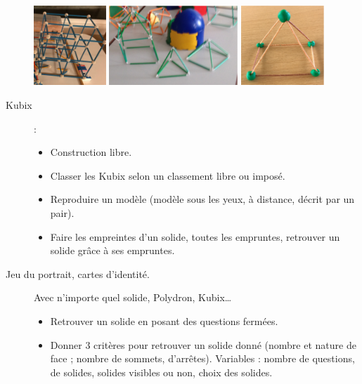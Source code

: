 \begin{exercice*}
\begin{description}
\begin{itemize}
      \end{itemize}
      \begin{center}
         \includegraphics[height=3cm]{Geometrie_did/Images/Geo6_activites_tiges1} \qquad \includegraphics[height=3cm]{Geometrie_did/Images/Geo6_activites_tiges2} \qquad \includegraphics[height=3cm]{Geometrie_did/Images/Geo6_activites_tiges3}
      \end{center}
   \item[Kubix]:
      \begin{itemize}
         \item Construction libre.
         \item Classer les Kubix selon un classement libre ou imposé.
         \item Reproduire un modèle (modèle sous les yeux, à distance, décrit par un pair).
         \item Faire les empreintes d'un solide, toutes les empruntes, retrouver un solide grâce à ses empruntes. \smallskip
      \end{itemize}
   \item[Jeu du portrait, cartes d'identité.]Avec n'importe quel solide, Polydron, Kubix\dots
      \begin{itemize}
         \item Retrouver un solide en posant des questions fermées.
         \item Donner 3 critères pour retrouver un solide donné (nombre et nature de face ; nombre de sommets, d’arrêtes). Variables : nombre de questions, de solides, solides visibles ou non, choix des solides.

\end{itemize}
\end{description}
\end{exercice*}
